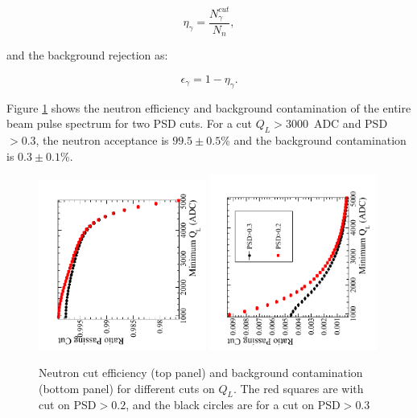 \documentclass[review]{elsarticle}
\begin{document}
\begin{equation}
\eta_{\gamma}= \frac{N_{\gamma}^{cut}}{N_n},
\end{equation}

\noindent and the background rejection as:

\begin{equation}
\epsilon_{\gamma} = 1 - \eta_{\gamma}.
\end{equation}

\noindent Figure \ref{fig:detectionEff} shows the neutron efficiency
and background contamination of the entire beam pulse spectrum for two
PSD cuts.  For a cut $Q_L>3000$~ADC and PSD$>0.3$, the neutron
acceptance is $99.5\pm0.5$\% and the background contamination
is $0.3\pm0.1$\%.


\begin{figure}[!htpb]
\centering \includegraphics[width =0.49\textwidth, angle=-90]{figures/neutroneff.pdf}
\centering \includegraphics[width =0.49\textwidth, angle=-90]{figures/backgroundconta.pdf}
\caption{ Neutron cut efficiency (top panel) and background
  contamination (bottom panel) for different cuts on $Q_L$.  The red
  squares are with cut on PSD$>0.2$, and the black circles are for a
  cut on PSD$>0.3$ }
\label{fig:detectionEff}
\end{figure}
\end{document}
